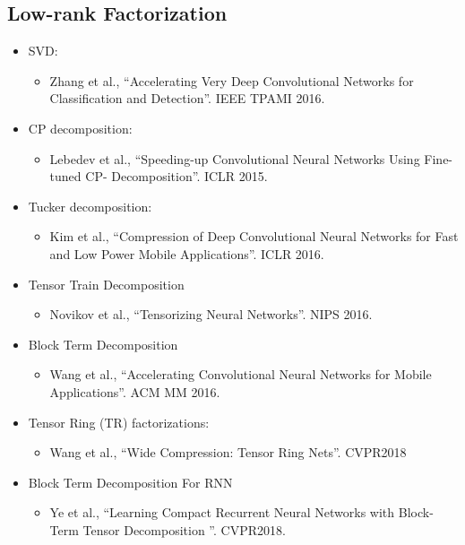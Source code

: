\documentclass[a4paper]{article}
\begin{document}
		\subsection{Low-rank Factorization}
			\begin{itemize}
				\item SVD:
					\begin{itemize}
						\item Zhang et al., “Accelerating Very Deep Convolutional Networks for Classification and
						Detection”. IEEE TPAMI 2016.
					\end{itemize}
				\item CP decomposition:
					\begin{itemize}
						\item Lebedev et al., “Speeding-up Convolutional Neural Networks Using Fine-tuned CP-
						Decomposition”. ICLR 2015.
					\end{itemize}
				\item Tucker decomposition:
					\begin{itemize}
						\item Kim et al., “Compression of Deep Convolutional Neural Networks for Fast and Low Power
						Mobile Applications”. ICLR 2016.
					\end{itemize}
				\item Tensor Train Decomposition
					\begin{itemize}
						\item Novikov et al., “Tensorizing Neural Networks”. NIPS 2016.
					\end{itemize}
				\item Block Term Decomposition
					\begin{itemize}
						\item Wang et al., “Accelerating Convolutional Neural Networks for Mobile Applications”. ACM
						MM 2016.
					\end{itemize}
				\item Tensor Ring (TR) factorizations:
					\begin{itemize}
						\item Wang et al., “Wide Compression: Tensor Ring Nets”. CVPR2018
					\end{itemize}
				\item Block Term Decomposition For RNN
					\begin{itemize}
						\item Ye et al., “Learning Compact Recurrent Neural Networks with Block-Term Tensor
						Decomposition ”. CVPR2018.
					\end{itemize}
			\end{itemize}			
\end{document}
